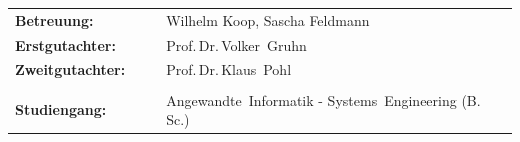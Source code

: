 \begin{sffamily}
\begin{center}
\normalsize{
\begin{tabular*}{\linewidth}{p{0.3\linewidth}p{0.7\linewidth}}
\textbf{Betreuung:}      & Wilhelm Koop, Sascha Feldmann\\
\textbf{Erstgutachter:}  & Prof.\,Dr.\,Volker~Gruhn\\
\textbf{Zweitgutachter:} & Prof.\,Dr.\,Klaus~Pohl\\
\\
\textbf{Studiengang:}    & Angewandte~Informatik - Systems~Engineering (B.\,Sc.)
\end{tabular*}
}

\end{center}

\end{sffamily}
\clearpage